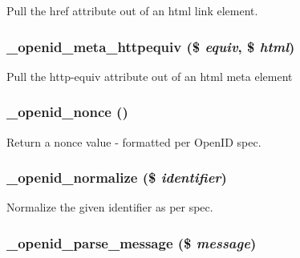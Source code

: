 Pull the href attribute out of an html link element. \hypertarget{openid_8inc_cbf79310505895f32ef771f12addd3bc}{
\subsubsection[{\_\-openid\_\-meta\_\-httpequiv}]{\setlength{\rightskip}{0pt plus 5cm}\_\-openid\_\-meta\_\-httpequiv (\$ {\em equiv}, \/  \$ {\em html})}}
\label{openid_8inc_cbf79310505895f32ef771f12addd3bc}


Pull the http-equiv attribute out of an html meta element \hypertarget{openid_8inc_7f413b6dbcae0aab572b51b57f08b076}{
\subsubsection[{\_\-openid\_\-nonce}]{\setlength{\rightskip}{0pt plus 5cm}\_\-openid\_\-nonce ()}}
\label{openid_8inc_7f413b6dbcae0aab572b51b57f08b076}


Return a nonce value - formatted per OpenID spec. \hypertarget{openid_8inc_ba14f184dc28aa90da400e857cb3b537}{
\subsubsection[{\_\-openid\_\-normalize}]{\setlength{\rightskip}{0pt plus 5cm}\_\-openid\_\-normalize (\$ {\em identifier})}}
\label{openid_8inc_ba14f184dc28aa90da400e857cb3b537}


Normalize the given identifier as per spec. \hypertarget{openid_8inc_b5f88df8b540f08bd28e8a508bb49175}{
\subsubsection[{\_\-openid\_\-parse\_\-message}]{\setlength{\rightskip}{0pt plus 5cm}\_\-openid\_\-parse\_\-message (\$ {\em message})}}
\label{openid_8inc_b5f88df8b540f08bd28e8a508bb49175}



